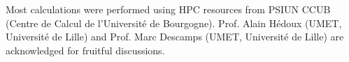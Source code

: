 \documentclass[journal=jpcbfk,manuscript=article]{achemso}
\begin{document}
\begin{singlespacing}
Most calculations were performed using HPC resources from PSIUN CCUB (Centre de Calcul de l'Universit\'e de Bourgogne).
Prof. Alain H\'edoux (UMET, Universit\'e de Lille) and Prof. Marc Descamps (UMET, Universit\'e de Lille)
are acknowledged for fruitful discussions.




\end{singlespacing}






\end{document}
